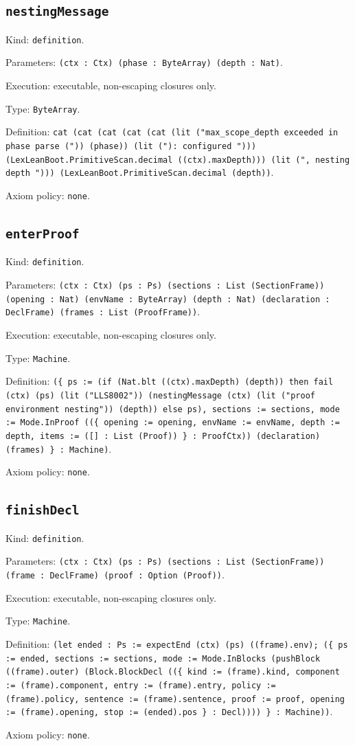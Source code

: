 \documentclass[11pt]{article}
\begin{document}
\subsection*{\texttt{nestingMessage}}
\noindent Kind: \texttt{definition}.\par
\noindent Parameters: \texttt{(ctx : Ctx) (phase : ByteArray) (depth : Nat)}.\par
\noindent Execution: executable, non-escaping closures only.\par
\noindent Type: \texttt{ByteArray}.\par
\noindent Definition: \texttt{cat (cat (cat (cat (cat (lit ("max\_scope\_depth exceeded in phase parse (")) (phase)) (lit ("): configured "))) (LexLeanBoot.PrimitiveScan.decimal ((ctx).maxDepth))) (lit (", nesting depth "))) (LexLeanBoot.PrimitiveScan.decimal (depth))}.\par
\noindent Axiom policy: \texttt{none}.\par
\subsection*{\texttt{enterProof}}
\noindent Kind: \texttt{definition}.\par
\noindent Parameters: \texttt{(ctx : Ctx) (ps : Ps) (sections : List (SectionFrame)) (opening : Nat) (envName : ByteArray) (depth : Nat) (declaration : DeclFrame) (frames : List (ProofFrame))}.\par
\noindent Execution: executable, non-escaping closures only.\par
\noindent Type: \texttt{Machine}.\par
\noindent Definition: \texttt{(\{ ps := (if (Nat.blt ((ctx).maxDepth) (depth)) then fail (ctx) (ps) (lit ("LLS8002")) (nestingMessage (ctx) (lit ("proof environment nesting")) (depth)) else ps), sections := sections, mode := Mode.InProof ((\{ opening := opening, envName := envName, depth := depth, items := ([] : List (Proof)) \} : ProofCtx)) (declaration) (frames) \} : Machine)}.\par
\noindent Axiom policy: \texttt{none}.\par
\subsection*{\texttt{finishDecl}}
\noindent Kind: \texttt{definition}.\par
\noindent Parameters: \texttt{(ctx : Ctx) (ps : Ps) (sections : List (SectionFrame)) (frame : DeclFrame) (proof : Option (Proof))}.\par
\noindent Execution: executable, non-escaping closures only.\par
\noindent Type: \texttt{Machine}.\par
\noindent Definition: \texttt{(let ended : Ps := expectEnd (ctx) (ps) ((frame).env); (\{ ps := ended, sections := sections, mode := Mode.InBlocks (pushBlock ((frame).outer) (Block.BlockDecl ((\{ kind := (frame).kind, component := (frame).component, entry := (frame).entry, policy := (frame).policy, sentence := (frame).sentence, proof := proof, opening := (frame).opening, stop := (ended).pos \} : Decl)))) \} : Machine))}.\par
\noindent Axiom policy: \texttt{none}.\par
\end{document}
